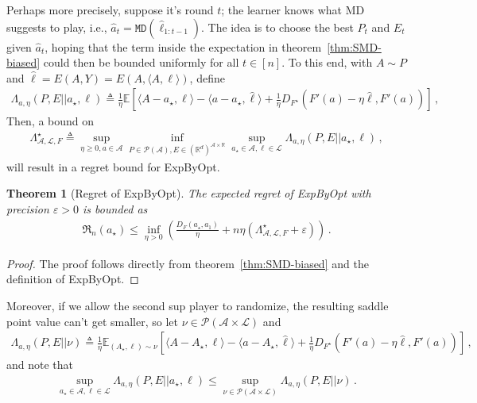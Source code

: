 \documentclass{article}
\theoremstyle{plain}
\newtheorem{theorem}{Theorem}
\theoremstyle{definition}
\renewcommand{\epsilon}{\varepsilon}
\newcommand{\R}{\mathbb R}
\newcommand{\Reg}{\mathfrak{R}}
\newcommand{\E}{\mathbb E}
\newcommand{\cL}{\mathcal L}
\newcommand{\cA}{\mathcal A}
\newcommand{\cP}{\mathcal P}
\newcommand{\fmd}{\texttt{MD}}
\newcommand{\mdalg}{\textsf{MD}\xspace}
\newcommand{\expbyopt}{\textsf{ExpByOpt}\xspace}
\newcommand{\hl}{\hat{\ell}\xspace}
\begin{document}
Perhaps more precisely, suppose it's round $t$; the learner knows what \mdalg suggests to play, i.e., $\hat{a}_t = \fmd(\hl_{1:t-1})$.
The idea is to choose the best $P_t$ and $E_t$ given $\hat{a}_t$,
hoping that the term inside the expectation in theorem~\ref{thm:SMD-biased} could
then be bounded uniformly for all $t \in [n]$.
To this end, with $A\sim P$ and
$\hl = E(A, Y) = E(A, \langle A, \ell\rangle)$, define
\begin{align}
    \label{eq:Lambda-original}
    \Lambda_{a, \eta}(P, E || a_\star, \ell) \triangleq
    \frac{1}{\eta}
    \E\left[
        \langle A - a_\star, \ell\rangle
        - \langle a - a_\star, \hl\rangle
        + \frac{1}{\eta} D_{F^\star}(F'(a) - \eta \hl, F'(a))
        \right]\,,
\end{align}
Then, a bound on
\begin{align*}
    \Lambda_{\cA, \cL, F}^\star \triangleq
    \sup_{\eta \geq 0, a \in \cA}
    \inf_{P \in \cP(\cA), E \in (\R^d)^{\cA \times \R}}
    \sup_{a_\star \in \cA, \ell \in \cL}
    \Lambda_{a, \eta}(P, E || a_\star, \ell)\,,
\end{align*}
will  result in a regret bound for \expbyopt.
\begin{theorem}[Regret of \expbyopt]
    \label{thm:exp-by-opt-regret}
    The expected regret of \expbyopt with precision $\epsilon > 0$
    is bounded as
    \begin{align*}
        \Reg_n(a_\star) \leq
        \inf_{\eta > 0}
        \left(
        \frac{D_F(a_\star, a_1)}{\eta}
        +
        n \eta
        \left(
            \Lambda_{\cA, \cL, F}^\star + \epsilon
            \right)
        \right)\,.
    \end{align*}
\end{theorem}
\begin{proof}
    The proof follows directly from theorem~\ref{thm:SMD-biased}
    and the definition of \expbyopt.
\end{proof}
Moreover, if we allow the second sup player to randomize, the resulting
saddle point value can't get smaller,
so let $\nu \in \cP(\cA \times \cL)$ and
\begin{align*}
    \Lambda_{a, \eta}(P, E || \nu) \triangleq
    \frac{1}{\eta}
    \E_{(A_\star, \ell) \sim \nu}\left[
        \langle A - A_\star, \ell\rangle
        - \langle a - A_\star, \hl\rangle
        + \frac{1}{\eta} D_{F^\star}(F'(a) - \eta \hl, F'(a))
        \right]\,,
\end{align*}
and note that
\begin{align*}
    \sup_{a_\star \in \cA, \ell \in \cL}
    \Lambda_{a, \eta}(P, E || a_\star, \ell)
    \leq
    \sup_{\nu \in \cP(\cA \times \cL)}
    \Lambda_{a, \eta}(P, E || \nu)\,.
\end{align*}
\end{document}
